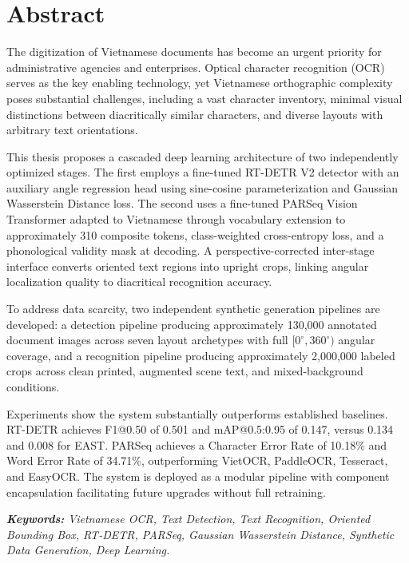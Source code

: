 \chapter*{Abstract}
The digitization of Vietnamese documents has become an urgent priority for administrative agencies and enterprises. Optical character recognition (OCR) serves as the key enabling technology, yet Vietnamese orthographic complexity poses substantial challenges, including a vast character inventory, minimal visual distinctions between diacritically similar characters, and diverse layouts with arbitrary text orientations.

This thesis proposes a cascaded deep learning architecture of two independently optimized stages. The first employs a fine-tuned RT-DETR V2 detector with an auxiliary angle regression head using sine-cosine parameterization and Gaussian Wasserstein Distance loss. The second uses a fine-tuned PARSeq Vision Transformer adapted to Vietnamese through vocabulary extension to approximately 310 composite tokens, class-weighted cross-entropy loss, and a phonological validity mask at decoding. A perspective-corrected inter-stage interface converts oriented text regions into upright crops, linking angular localization quality to diacritical recognition accuracy.

To address data scarcity, two independent synthetic generation pipelines are developed: a detection pipeline producing approximately 130,000 annotated document images across seven layout archetypes with full $[0^\circ, 360^\circ)$ angular coverage, and a recognition pipeline producing approximately 2,000,000 labeled crops across clean printed, augmented scene text, and mixed-background conditions.

Experiments show the system substantially outperforms established baselines. RT-DETR achieves F1@0.50 of 0.501 and mAP@0.5:0.95 of 0.147, versus 0.134 and 0.008 for EAST. PARSeq achieves a Character Error Rate of 10.18\% and Word Error Rate of 34.71\%, outperforming VietOCR, PaddleOCR, Tesseract, and EasyOCR. The system is deployed as a modular pipeline with component encapsulation facilitating future upgrades without full retraining.
\vspace{-0.5cm}
\begin{flushleft}
    \textit{\textbf{Keywords:} Vietnamese OCR, Text Detection, Text Recognition, Oriented Bounding Box, RT-DETR, PARSeq, Gaussian Wasserstein Distance, Synthetic Data Generation, Deep Learning.}
\end{flushleft}
\changefontsizes[16pt]{13pt}
